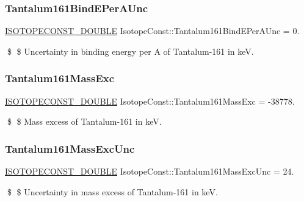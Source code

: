 \subsubsection{\texorpdfstring{Tantalum161\+Bind\+E\+Per\+A\+Unc}{Tantalum161BindEPerAUnc}}
{\footnotesize\ttfamily \mbox{\hyperlink{group___isotope_const-_macros_ga8f45a7272ce02c0b4c65c44636ed719a}{I\+S\+O\+T\+O\+P\+E\+C\+O\+N\+S\+T\+\_\+\+D\+O\+U\+B\+LE}} Isotope\+Const\+::\+Tantalum161\+Bind\+E\+Per\+A\+Unc = 0.}

\$ \$ Uncertainty in binding energy per A of Tantalum-\/161 in keV. \mbox{\label{group___isotope_const-_tantalum-_ta161_ga91d6059c4e56a725cfd658fb35fef6be}} 
\subsubsection{\texorpdfstring{Tantalum161\+Mass\+Exc}{Tantalum161MassExc}}
{\footnotesize\ttfamily \mbox{\hyperlink{group___isotope_const-_macros_ga8f45a7272ce02c0b4c65c44636ed719a}{I\+S\+O\+T\+O\+P\+E\+C\+O\+N\+S\+T\+\_\+\+D\+O\+U\+B\+LE}} Isotope\+Const\+::\+Tantalum161\+Mass\+Exc = -\/38778.}

\$ \$ Mass excess of Tantalum-\/161 in keV. \mbox{\label{group___isotope_const-_tantalum-_ta161_ga41347d6a7d4ded7f71e43f6fecb0d5a3}} 
\subsubsection{\texorpdfstring{Tantalum161\+Mass\+Exc\+Unc}{Tantalum161MassExcUnc}}
{\footnotesize\ttfamily \mbox{\hyperlink{group___isotope_const-_macros_ga8f45a7272ce02c0b4c65c44636ed719a}{I\+S\+O\+T\+O\+P\+E\+C\+O\+N\+S\+T\+\_\+\+D\+O\+U\+B\+LE}} Isotope\+Const\+::\+Tantalum161\+Mass\+Exc\+Unc = 24.}

\$ \$ Uncertainty in mass excess of Tantalum-\/161 in keV. \mbox{\label{group___isotope_const-_tantalum-_ta161_ga6704e59bce5541647031f179af491d73}} 
